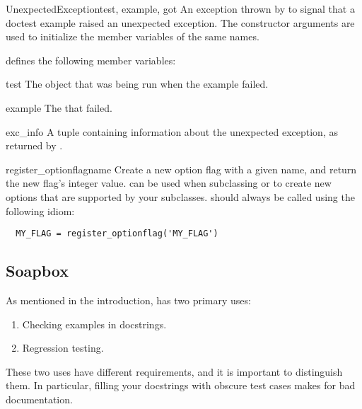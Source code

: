 \begin{excclassdesc}{UnexpectedException}{test, example, got}
    An exception thrown by  to signal that a
    doctest example raised an unexpected exception.  The constructor
    arguments are used to initialize the member variables of the same
    names.
\end{excclassdesc}
 defines the following member variables:
\begin{memberdesc}{test}
    The  object that was being run when the example failed.
\end{memberdesc}
\begin{memberdesc}{example}
    The  that failed.
\end{memberdesc}
\begin{memberdesc}{exc_info}
    A tuple containing information about the unexpected exception, as
    returned by .
\end{memberdesc}

\begin{funcdesc}{register_optionflag}{name}
    Create a new option flag with a given name, and return the new
    flag's integer value.   can be
    used when subclassing  or
     to create new options that are supported by
    your subclasses.   should always be
    called using the following idiom:
\begin{verbatim}
  MY_FLAG = register_optionflag('MY_FLAG')
\end{verbatim}
\end{funcdesc}

\subsection{Soapbox\label{doctest-soapbox}}

As mentioned in the introduction,  has two primary
uses:

\begin{enumerate}
\item Checking examples in docstrings.
\item Regression testing.
\end{enumerate}

These two uses have different requirements, and it is important to
distinguish them.  In particular, filling your docstrings with obscure
test cases makes for bad documentation.

